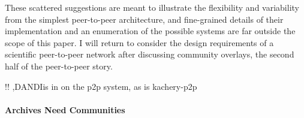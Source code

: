 \documentclass{article}
\begin{document}
These scattered suggestions are meant to illustrate the flexibility and
variability from the simplest peer-to-peer architecture, and
fine-grained details of their implementation and an enumeration of the
possible systems are far outside the scope of this paper. I will return
to consider the design requirements of a scientific peer-to-peer network
after discussing community overlays, the second half of the peer-to-peer
story.

!! \cite{langilleBioTorrentsFileSharing2010},DANDIis in on the
p2p system, as is kachery-p2p

\hypertarget{archives-need-communities}{%
\paragraph{Archives Need Communities}\label{archives-need-communities}}
\end{document}
